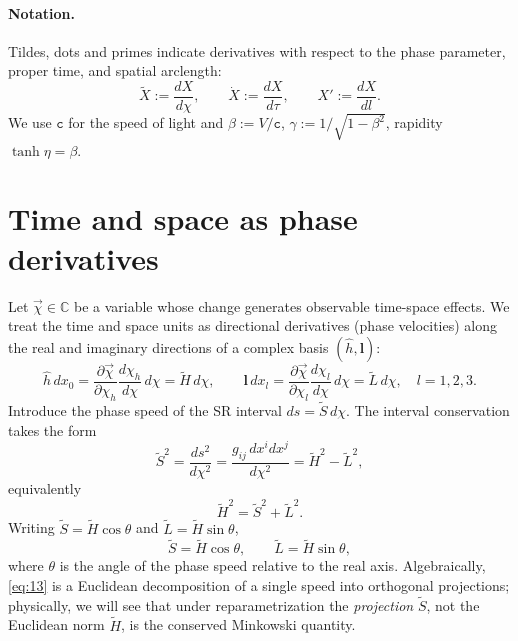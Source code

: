 \documentclass[11pt]{article}
\numberwithin{equation}{section}
\begin{document}
\paragraph{Notation.} Tildes, dots and primes indicate derivatives with respect to the phase parameter, proper time, and spatial arclength:
\[
\tilde{X}:=\frac{dX}{d\chi},\qquad \dot{X}:=\frac{dX}{d\tau},\qquad X':=\frac{dX}{dl}.
\]
We use $\mathtt{c}$ for the speed of light and $\beta:=V/\mathtt{c}$, $\gamma:=1/\sqrt{1-\beta^2}$, rapidity $\tanh\eta=\beta$.

\section{Time and space as phase derivatives}
Let $\vec{\chi}\in\mathbb{C}$ be a variable whose change generates observable time-space effects. We treat the time and space units as directional derivatives (phase velocities) along the real and imaginary directions of a complex basis $(\hat{h},\mathbf{l})$:
\begin{equation}
\hat{h}\,dx_0=\frac{\partial\vec{\chi}}{\partial\chi_h}\frac{d\chi_h}{d\chi}\,d\chi
=\tilde{H}\,d\chi,\qquad
\mathbf{l}\,dx_l=\frac{\partial\vec{\chi}}{\partial\chi_l}\frac{d\chi_l}{d\chi}\,d\chi
=\tilde{L}\,d\chi,\quad l=1,2,3.
\label{eq:11}
\end{equation}
Introduce the phase speed of the SR interval $ds=\tilde{S}\,d\chi$. The interval conservation takes the form
\begin{equation}
\tilde{S}^2=\frac{ds^2}{d\chi^2}
=\frac{g_{ij}\,dx^i dx^j}{d\chi^2}
=\tilde{H}^2-\tilde{L}^2,
\label{eq:12}
\end{equation}
equivalently
\begin{equation}
\tilde{H}^2=\tilde{S}^2+\tilde{L}^2.
\label{eq:13}
\end{equation}
Writing $\tilde{S}=\tilde{H}\cos\theta$ and $\tilde{L}=\tilde{H}\sin\theta$,
\begin{equation}
\tilde{S}=\tilde{H}\cos\theta,\qquad \tilde{L}=\tilde{H}\sin\theta,
\label{eq:14}
\end{equation}
where $\theta$ is the angle of the phase speed relative to the real axis. Algebraically, \eqref{eq:13} is a Euclidean decomposition of a single speed into orthogonal projections; physically, we will see that under reparametrization the \emph{projection} $\tilde{S}$, not the Euclidean norm $\tilde{H}$, is the conserved Minkowski quantity.
\end{document}
